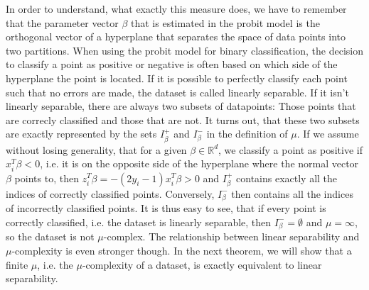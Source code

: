 In order to understand, what exactly this measure does, we have to
remember that the parameter vector $\beta$ that is estimated in
the probit model is the orthogonal vector of a hyperplane that separates the
space of data points into two partitions.
When using the probit model for binary classification,
the decision to classify a point as positive or negative is often
based on which side of the hyperplane the point is located.
If it is possible to perfectly classify each point such that no
errors are made, the dataset is called linearly separable.
If it isn't linearly separable, there are always two subsets of
datapoints: Those points that are correcly classified and those that
are not. It turns out, that these two subsets are exactly represented
by the sets $I_\beta^+$ and $I_\beta^-$ in the definition of $\mu$.
If we assume without losing generality, that for a given
$\beta \in \mathbb{R}^d$, we classify a point as
positive if $x_i^T \beta < 0$, i.e. it is on the opposite side
of the hyperplane where the normal vector $\beta$ points to,
then $z_i^T \beta = -(2y_i - 1)x_i^T \beta > 0$ and $I_\beta^+$
contains exactly all the indices of correctly classified points.
Conversely, $I_\beta^-$ then contains all the indices of incorrectly
classified points.
It is thus easy to see, that if every point is correctly classified,
i.e. the dataset is linearly separable,
then $I_\beta^- = \emptyset$ and $\mu = \infty$, so the dataset
is not $\mu$-complex.
The relationship between linear separability and
$\mu$-complexity is even stronger though. In the next theorem,
we will show that a finite $\mu$, i.e. the $\mu$-complexity
of a dataset, is exactly equivalent to linear separability.

